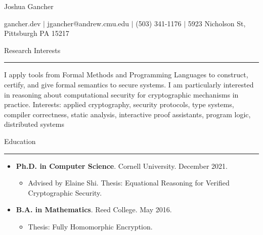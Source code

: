 \documentclass{article}
\begin{document}
\begin{center}
    \Huge Joshua Gancher
\end{center}
\begin{center}
    gancher.dev $\mid$ jgancher@andrew.cmu.edu $\mid$ (503) 341-1176 $\mid$ 5923
    Nicholson St, Pittsburgh PA 15217
 \end{center}

{\huge Research Interests}
\vspace{3pt}
 \hrule
\vspace{5pt}
I apply tools from Formal Methods and Programming Languages 
to construct,
certify, and give formal semantics to secure systems.
I am particularly interested in reasoning about computational security for cryptographic mechanisms in practice.
Interests: applied cryptography, security protocols, type systems, compiler
correctness, static analysis, interactive proof assistants, program logic, distributed systems

\vspace{10pt}
{\huge Education}
\vspace{3pt}
 \hrule
\begin{itemize}
    \item {\bf Ph.D. in Computer Science}. Cornell University. December 2021.
        \begin{itemize}
            \item Advised by Elaine Shi. Thesis:  Equational Reasoning for Verified Cryptographic
                Security.
        \end{itemize}
    \item {\bf B.A. in Mathematics}. Reed College. May 2016.
        \begin{itemize}
            \item Thesis: Fully Homomorphic Encryption.
        \end{itemize}
\end{itemize}
\end{document}
